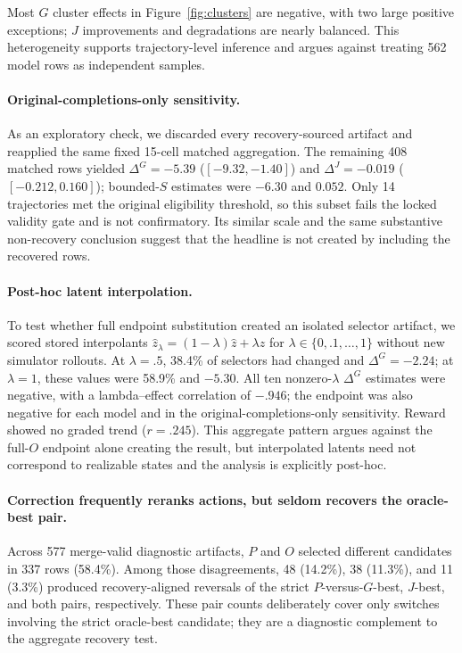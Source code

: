 \documentclass[letterpaper,10pt,conference]{ieeeconf}
\begin{document}
Most $G$ cluster effects in Figure~\ref{fig:clusters} are negative, with two
large positive exceptions; $J$ improvements and degradations are nearly
balanced. This heterogeneity supports trajectory-level inference and argues
against treating 562 model rows as independent samples.

\paragraph{Original-completions-only sensitivity.}
As an exploratory check, we discarded every recovery-sourced artifact and
reapplied the same fixed 15-cell matched aggregation. The remaining 408 matched
rows yielded $\Delta^G=-5.39$ ($[-9.32,-1.40]$) and
$\Delta^J=-0.019$ ($[-0.212,0.160]$); bounded-$S$ estimates were $-6.30$ and
$0.052$. Only 14 trajectories met the original eligibility threshold, so this
subset fails the locked validity gate and is not confirmatory. Its similar
scale and the same substantive non-recovery conclusion suggest that the headline
is not created by including the recovered rows.

\paragraph{Post-hoc latent interpolation.}
To test whether full endpoint substitution created an isolated selector artifact,
we scored stored interpolants
$\hat z_\lambda=(1-\lambda)\hat z+\lambda z$ for
$\lambda\in\{0,.1,\ldots,1\}$ without new simulator rollouts. At $\lambda=.5$,
38.4\% of selectors had changed and $\Delta^G=-2.24$; at $\lambda=1$, these
values were 58.9\% and $-5.30$. All ten nonzero-$\lambda$ $\Delta^G$ estimates
were negative, with a lambda--effect correlation of $-.946$; the endpoint was
also negative for each model and in the original-completions-only sensitivity.
Reward showed no graded trend ($r=.245$). This aggregate pattern argues against
the full-$O$ endpoint alone creating the result, but interpolated latents need
not correspond to realizable states and the analysis is explicitly post-hoc.

\paragraph{Correction frequently reranks actions, but seldom recovers the
oracle-best pair.}
Across 577 merge-valid diagnostic artifacts, $P$ and $O$ selected different
candidates in 337 rows (58.4\%). Among those disagreements, 48 (14.2\%), 38
(11.3\%), and 11 (3.3\%) produced recovery-aligned reversals of the strict
$P$-versus-$G$-best, $J$-best, and both pairs, respectively. These pair
counts deliberately cover only switches involving the strict oracle-best
candidate; they are a diagnostic complement to the aggregate recovery test.
\end{document}
